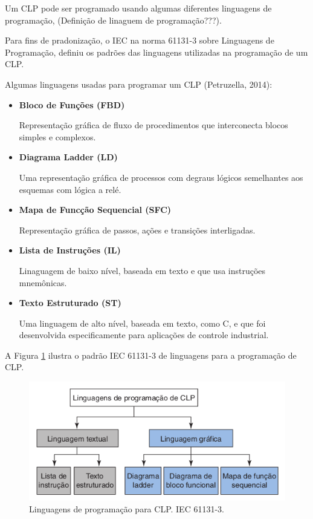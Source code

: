 \documentclass[a4paper, 12pt]{article}
\begin{document}
		Um CLP pode ser programado usando algumas diferentes linguagens de programação, (Definição de linaguem de programação???).
		
		Para fins de pradonização, o IEC na norma 61131-3 sobre Linguagens de Programação,
		definiu os padrões das linguagens utilizadas na programação de um CLP.

		Algumas linguagens usadas para programar um CLP (Petruzella, 2014):
		
		\begin{itemize}
			\item \textbf{Bloco de Funções (FBD)}
			
				Representação gráfica de fluxo de procedimentos que interconecta blocos simples
				e complexos.
				
			\item \textbf{Diagrama Ladder (LD)}
			
				Uma representação gráfica de processos com degraus lógicos semelhantes aos esquemas
				com lógica a relé.
				
			\item \textbf{Mapa de Funcção Sequencial (SFC)}
			
				Representação gráfica de passos, ações e transições interligadas.
				
			\item \textbf{Lista de Instruções (IL)}
			
				Linaguagem de baixo nível, baseada em texto e que usa instruções mnemônicas.
				
			\item \textbf{Texto Estruturado (ST)}
			
				Uma linguagem de alto nível, baseada em texto, como C, e que foi desenvolvida
				especificamente para aplicações de controle industrial.
				
		\end{itemize}
		
		A Figura \ref{fig:progam-language-clp} ilustra o padrão IEC 61131-3 de linguagens para a programação de CLP.

		\begin{figure}[H]
			\centering
			\includegraphics[scale=0.5]{figures/programming_language_for_CLP_IEC-61131-3.png}
			\caption{Linguagens de programação para CLP. IEC 61131-3.}
			\label{fig:progam-language-clp}
		\end{figure}
		
\end{document}
